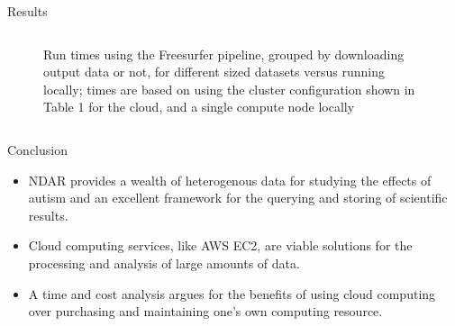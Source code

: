 \documentclass[final,hyperref={pdfpagelabels=false}]{beamer}
\begin{document}
\begin{frame}
\begin{columns}
\begin{column}{.5\textwidth}
\begin{block}{Results}
\begin{column}{.47\textwidth}
\begin{figure}
                    \caption{\label{fig:fs-times}Run times using the Freesurfer pipeline, grouped by downloading output data or not, for different sized datasets versus running locally; times are based on using the cluster configuration shown in Table 1 for the cloud, and a single compute node locally}
                \end{figure}
            \end{column}
        \end{block}
        \begin{block}{Conclusion}
            \begin{itemize}
                \item NDAR provides a wealth of heterogenous data for studying the effects of autism and an excellent framework for the querying and storing of scientific results.
                \item Cloud computing services, like AWS EC2, are viable solutions for the processing and analysis of large amounts of data.
                \item A time and cost analysis argues for the benefits of using cloud computing over purchasing and maintaining one's own computing resource.
            \end{itemize}
        \end{block}
    
    \end{column}
	\end{columns}
	
	\begin{columns}
		\begin{column}{.975\textwidth}
	 \end{column}
    \end{columns}
	
\end{frame}
\end{document}
